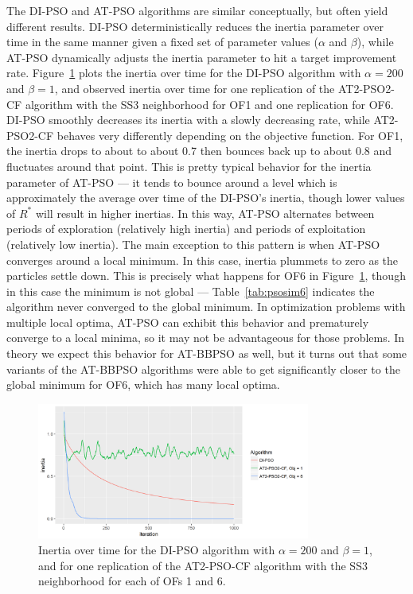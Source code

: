 \documentclass[cmbright]{staauth}
\begin{document}
The DI-PSO and AT-PSO algorithms are similar conceptually, but often yield different results. DI-PSO deterministically reduces the inertia parameter over time in the same manner given a fixed set of parameter values ($\alpha$ and $\beta$), while AT-PSO dynamically adjusts the inertia parameter to hit a target improvement rate. Figure~\ref{fig:inertia} plots the inertia over time for the DI-PSO algorithm with $\alpha=200$ and $\beta=1$, and observed inertia over time for one replication of the AT2-PSO2-CF algorithm with the SS3 neighborhood for OF1 and one replication for OF6. DI-PSO smoothly decreases its inertia with a slowly decreasing rate, while AT2-PSO2-CF behaves very differently depending on the objective function. For OF1, the inertia drops to about to about 0.7 then bounces back up to about 0.8 and fluctuates around that point. This is pretty typical behavior for the inertia parameter of AT-PSO --- it tends to bounce around a level which is approximately the average over time of the DI-PSO's inertia, though lower values of $R^*$ will result in higher inertias. In this way, AT-PSO alternates between periods of exploration (relatively high inertia) and periods of exploitation (relatively low inertia). The main exception to this pattern is when AT-PSO converges around a local minimum. In this case, inertia plummets to zero as the particles settle down. This is precisely what happens for OF6 in Figure~\ref{fig:inertia}, though in this case the minimum is not global --- Table~\ref{tab:psosim6} indicates the algorithm never converged to the global minimum. In optimization problems with multiple local optima, AT-PSO can exhibit this behavior and prematurely converge to a local minima, so it may not be advantageous for those problems. In theory we expect this behavior for AT-BBPSO as well, but it turns out that some variants of the AT-BBPSO algorithms were able to get significantly closer to the global minimum for OF6, which has many local optima.

\begin{figure}[p]
\centering
\includegraphics[width=0.8\textwidth]{inertiaplot.png}
\caption{Inertia over time for the DI-PSO algorithm with $\alpha=200$ and $\beta=1$, and for one replication of the AT2-PSO-CF algorithm with the SS3 neighborhood for each of OFs 1 and 6.}
\label{fig:inertia}
\end{figure}
\end{document}
